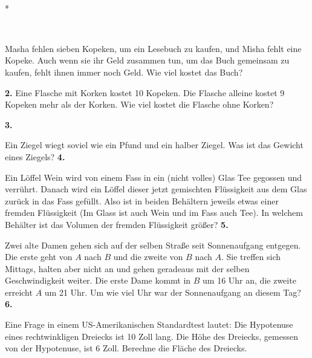 \documentclass[12pt]{article} %
\begin{document}
\ 

\vspace{0pt plus 12pt}
\centerline{*\quad *\quad*}
\vspace{.4\baselineskip}

\

{} 

Masha fehlen sieben Kopeken, um ein Lesebuch zu kaufen, und Misha fehlt eine Kopeke. Auch wenn sie ihr Geld zusammen tun, um das Buch gemeinsam zu kaufen, fehlt ihnen immer noch Geld. Wie viel kostet das Buch? 
\newline\newline\quad

{\bf 2.} 
Eine Flasche mit Korken kostet 10 Kopeken. Die Flasche alleine kostet 9 Kopeken mehr als der Korken. Wie viel kostet die Flasche ohne Korken?

\newline\newline{}\quad
{\bf 3.} 

Ein Ziegel wiegt soviel wie ein Pfund und ein halber Ziegel. Was ist das Gewicht eines Ziegels? 
\newline\newline\quad
{\bf 4.} 

Ein Löffel Wein wird von einem Fass in ein (nicht volles) Glas Tee gegossen und verrührt. Danach wird ein Löffel dieser jetzt gemischten Flüssigkeit aus dem Glas zurück in das Fass gefüllt. Also ist in beiden Behältern jeweils etwas einer fremden Flüssigkeit (Im Glass ist auch Wein und im Fass auch Tee). In welchem Behälter ist das Volumen der fremden Flüssigkeit größer?
\newline\newline\quad
{\bf 5.} 

Zwei alte Damen gehen sich auf der selben Straße seit Sonnenaufgang entgegen. Die erste geht von $A$ nach $B$ und die zweite von $B$ nach $A$. Sie treffen sich Mittags, halten aber nicht an und gehen geradeaus mit der selben Geschwindigkeit weiter. Die erste Dame kommt in $B$ um 16 Uhr an, die zweite erreicht $A$ um 21 Uhr. Um wie viel Uhr war der Sonnenaufgang an diesem Tag?
\newline\newline\quad
{\bf 6.} 

Eine Frage in einem US-Amerikanischen Standardtest lautet: Die Hypotenuse eines rechtwinkligen Dreiecks ist  10 Zoll lang. Die Höhe des Dreiecks, gemessen von der Hypotenuse, ist 6 Zoll. Berechne die Fläche des Dreiecks.
\end{document}
